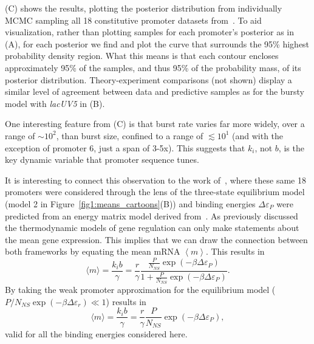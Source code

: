 (C) shows the results, plotting the posterior
distribution from individually MCMC sampling all 18 constitutive promoter
datasets from~\cite{Jones2014}. To aid visualization, rather than plotting
samples for each promoter's posterior as in (A), for
each posterior we find and plot the curve that surrounds the 95\% highest
probability density region. What this means is that each contour 
encloses approximately 95\% of the samples, and thus 95\% of the probability
mass, of its posterior distribution. Theory-experiment comparisons (not shown)
display a similar level of agreement between data and predictive samples as for
the bursty model with \textit{lacUV5} in (B).

One interesting feature from (C) is that burst rate
varies far more widely, over a range of $\sim10^2$, than burst size, confined to
a range of $\lesssim10^1$ (and with the exception of promoter 6, just a span of
3-5x). This suggests that $k_i$, not $b$, is the key dynamic variable that
promoter sequence tunes.

It is interesting to connect this observation to the work
of~\cite{Brewster2012}, where these same 18 promoters were considered through
the lens of the three-state equilibrium model (model 2 in
Figure~\ref{fig1:means_cartoons}(B)) and binding energies $\Delta\varepsilon_P$
were predicted from an energy matrix model derived from~\cite{Kinney2010}. As
previously discussed the thermodynamic models of gene regulation can only make
statements about the mean gene expression. This implies that we can draw the
connection between both frameworks by equating the mean mRNA $\left\langle m
\right\rangle$. This results in
\begin{equation}
\langle m \rangle = \frac{k_i b}{\gamma}
        = \frac{r}{\gamma}
        \frac{\frac{P}{N_{NS}}\exp(-\beta\Delta\varepsilon_P)}
                {1+\frac{P}{N_{NS}}\exp(-\beta\Delta\varepsilon_P)}.
\end{equation}
By taking the weak promoter approximation for the equilibrium model ($P/N_{NS} 
\exp(-\beta\Delta\varepsilon_r) \ll 1$) results in
\begin{equation}
\langle m \rangle = \frac{k_i b}{\gamma}
        = \frac{r}{\gamma} \frac{P}{N_{NS}}\exp(-\beta\Delta\varepsilon_P),
\end{equation}
valid for all the binding energies considered here.

